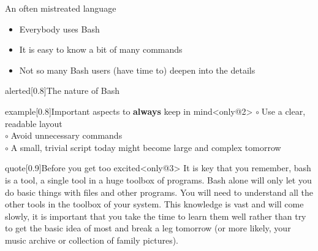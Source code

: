 
\begin{frame}{An often mistreated language}
    \vspace{-3mm}
    \begin{itemize}
        \item Everybody uses Bash
        \item It is easy to know a bit of many commands
        \item Not so many Bash users (have time to) deepen into the details
    \end{itemize}
    \begin{varblock}{alerted}[0.8\textwidth]{The nature of Bash}
    \end{varblock}
    \begin{overlayarea}{\textwidth}{0.6\textheight}
        \begin{varblock*}{example}[0.8\textwidth]{Important aspects to \textbf{always} keep in mind}<only@2>
            $\circ\;$Use a clear, readable layout\\
            $\circ\;$Avoid unnecessary commands\\
            $\circ\;$A small, trivial script today might become large and complex tomorrow
        \end{varblock*}
        \begin{varblock}{quote}[0.9\textwidth]{Before you get too excited}<only@3>
            It is key that you remember, bash is a tool, a single tool in a huge toolbox of programs. 
            Bash alone will only let you do basic things with files and other programs.
            You will need to understand all the other tools in the toolbox of your system.
            This knowledge is vast and will come slowly, it is important that you take the time to learn them well rather than try to get the basic idea of most and break a leg tomorrow (or more likely, your music archive or collection of family pictures).
        \end{varblock}
    \end{overlayarea}
\end{frame}
